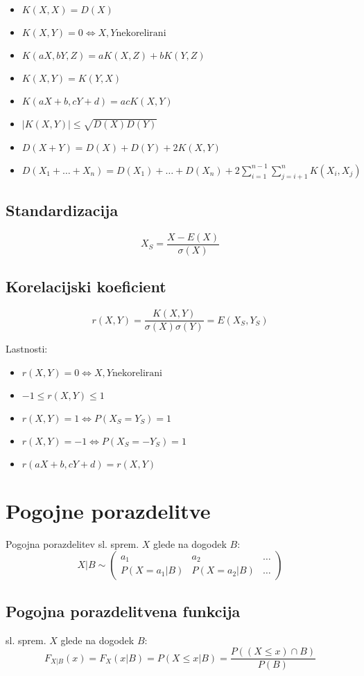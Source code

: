 \begin{multicols}{5}
\begin{itemize}
	\item $K(X,X) = D(X)$
	\item $K(X,Y) = 0 \iff X,Y \text{nekorelirani}$
	\item $K(aX,bY, Z) = aK(X, Z) + bK(Y, Z)$
	\item $K(X,Y) = K(Y,X)$
	\item $K(aX+b,cY+d) = acK(X,Y)$
	\item $|K(X,Y)| \leq \sqrt{D(X)D(Y)}$
	\item $D(X+Y) = D(X) + D(Y) + 2K(X,Y)$ 
	\item $D(X_1 + \dots + X_n) = D(X_1) + \dots + D(X_n) + 2\sum_{i=1}^{n-1}\sum_{j=i+1}^{n} K(X_i, X_j)$
\end{itemize}

\subsection{Standardizacija}
\[X_S = \frac{X-E(X)}{\sigma(X)}\]

\subsection{Korelacijski koeficient}
\[r(X,Y) = \frac{K(X, Y)}{ \sigma(X) \sigma(Y)} = E(X_S, Y_S)\]

Lastnosti:
\begin{itemize}
	\item $r(X,Y) = 0 \iff X, Y \text{nekorelirani}$
	\item $-1 \leq r(X,Y) \leq 1$
	\item $r(X,Y) = 1 \iff P(X_S = Y_S) = 1$
	\item $r(X,Y) = -1 \iff P(X_S = -Y_S) = 1$
	\item $r(aX+b, cY+d) = r(X, Y)$
\end{itemize}

\section{Pogojne porazdelitve}
Pogojna porazdelitev sl. sprem. $X$ glede na dogodek $B$:
\[ X|B \sim \left( \begin{matrix}
	a_1 & a_2 &\dots \\
	P(X = a_1 | B) & P(X = a_2 | B) &\dots 
\end{matrix}\right)\]

\subsection{Pogojna porazdelitvena funkcija}
sl. sprem. $X$ glede na dogodek $B$:
\[ F_{X|B}(x) = F_X(x|B) = P(X \leq x | B) = \frac{P((X\leq x) \cap B)}{P(B)} \]


\end{multicols}
